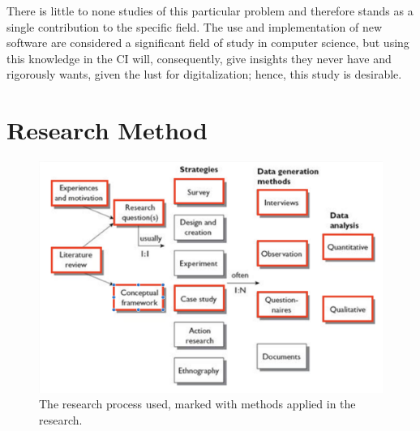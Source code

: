 There is little to none studies of this particular problem and therefore stands as a single contribution to the specific field. The use and implementation of new software are considered a significant field of study in computer science, but using this knowledge in the CI will, consequently, give insights they never have and rigorously wants, given the lust for digitalization; hence, this study is desirable.

\section*{Research Method}

\begin{figure}
    \includegraphics[scale=0.23]{empirisk.png}
    \caption{The research process used, marked with methods applied in the research.}
    \label{fig:my_label}
\end{figure}

